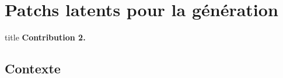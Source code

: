 \documentclass[aspectratio=169, 22pt]{beamer}
\begin{document}
\section{Patchs latents pour la génération}
\begin{frame}
  \begin{beamercolorbox}[sep=15pt,center,shadow=true,rounded=true]{title}
    \LARGE\bfseries Contribution 2.\\ \secname
  \end{beamercolorbox}
\end{frame}

\subsection{Contexte}
\end{document}
